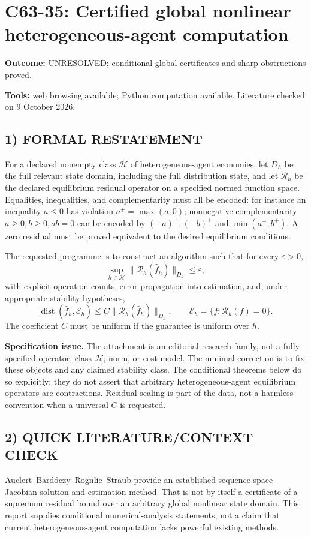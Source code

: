 \documentclass[11pt,a4paper]{article}
\newcommand{\dist}{\operatorname{dist}}
\theoremstyle{definition}
\begin{document}
\section*{C63-35: Certified global nonlinear heterogeneous-agent computation}
\textbf{Outcome:} UNRESOLVED; conditional global certificates and sharp obstructions proved.\par\textbf{Tools:} web browsing available; Python computation available. Literature checked on 9 October 2026.
\subsection*{1) FORMAL RESTATEMENT}
For a declared nonempty class $\mathcal H$ of heterogeneous-agent economies, let $D_h$ be the full relevant state domain, including the full distribution state, and let $\mathcal R_h$ be the declared equilibrium residual operator on a specified normed function space. Equalities, inequalities, and complementarity must all be encoded: for instance an inequality $a\le0$ has violation $a^+=\max(a,0)$; nonnegative complementarity $a\ge0,b\ge0,ab=0$ can be encoded by $(-a)^+,(-b)^+$ and $\min(a^+,b^+)$. A zero residual must be proved equivalent to the desired equilibrium conditions.

The requested programme is to construct an algorithm such that for every $\varepsilon>0$,
\[
 \sup_{h\in\mathcal H}\|\mathcal R_h(\widehat f_h)\|_{D_h}\le\varepsilon,
\]
with explicit operation counts, error propagation into estimation, and, under appropriate stability hypotheses,
\[
 \dist(\widehat f_h,\mathcal E_h)
       \le C\|\mathcal R_h(\widehat f_h)\|_{D_h},
 \qquad \mathcal E_h=\{f:\mathcal R_h(f)=0\}.
\]
The coefficient $C$ must be uniform if the guarantee is uniform over $h$.

\textbf{Specification issue.} The attachment is an editorial research family, not a fully specified operator, class $\mathcal H$, norm, or cost model. The minimal correction is to fix these objects and any claimed stability class. The conditional theorems below do so explicitly; they do not assert that arbitrary heterogeneous-agent equilibrium operators are contractions. Residual scaling is part of the data, not a harmless convention when a universal $C$ is requested.

\subsection*{2) QUICK LITERATURE/CONTEXT CHECK}
Auclert--Bard\'oczy--Rognlie--Straub \cite{ABRS} provide an established sequence-space Jacobian solution and estimation method. That is not by itself a certificate of a supremum residual bound over an arbitrary global nonlinear state domain. This report supplies conditional numerical-analysis statements, not a claim that current heterogeneous-agent computation lacks powerful existing methods.
\end{document}
